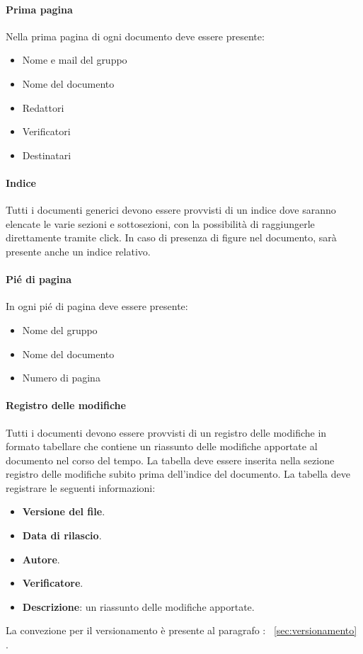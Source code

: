\documentclass{article}
\begin{document}
\paragraph*{Prima pagina}
Nella prima pagina di ogni documento deve essere presente:
\begin{itemize}
    \item Nome e mail del gruppo
    \item Nome del documento
    \item Redattori
    \item Verificatori
    \item Destinatari
\end{itemize}
\paragraph*{Indice}
Tutti i documenti generici devono essere provvisti di un indice dove saranno elencate le varie sezioni e sottosezioni, con la possibilità di raggiungerle direttamente tramite click.
In caso di presenza di figure nel documento, sarà presente anche un indice relativo.
\paragraph*{Pié di pagina}
In ogni pié di pagina deve essere presente:
\begin{itemize}
    \item Nome del gruppo
    \item Nome del documento
    \item Numero di pagina
\end{itemize}
\paragraph*{Registro delle modifiche}\label{sec:RegistroModifiche}
Tutti i documenti devono essere provvisti di un registro delle modifiche in formato tabellare che contiene un riassunto
delle modifiche apportate al documento nel corso del tempo.
La tabella  deve essere inserita nella
sezione registro delle modifiche subito prima dell’indice del documento.
La tabella deve registrare le seguenti informazioni:
\begin{itemize}
    \item \textbf{Versione del file}.
    \item \textbf{Data di rilascio}.
    \item \textbf{Autore}.
    \item \textbf{Verificatore}.
    \item \textbf{Descrizione}: un riassunto delle modifiche apportate.
\end{itemize}
La convezione per il versionamento è presente al paragrafo : ~\ref{sec:versionamento} .
\end{document}
